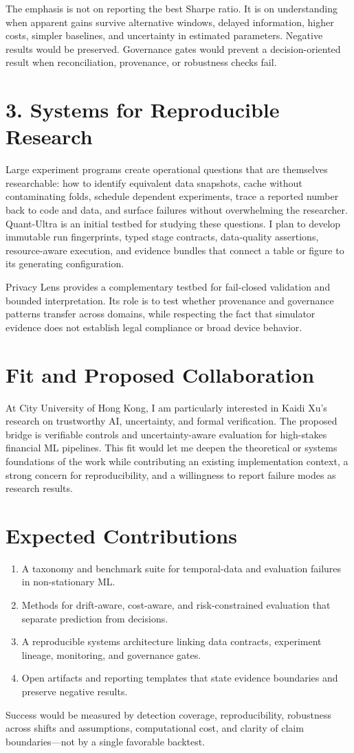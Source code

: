\documentclass[11pt]{article}
\begin{document}
The emphasis is not on reporting the best Sharpe ratio. It is on understanding when apparent gains survive alternative windows, delayed information, higher costs, simpler baselines, and uncertainty in estimated parameters. Negative results would be preserved. Governance gates would prevent a decision-oriented result when reconciliation, provenance, or robustness checks fail.

\section*{3. Systems for Reproducible Research}
Large experiment programs create operational questions that are themselves researchable: how to identify equivalent data snapshots, cache without contaminating folds, schedule dependent experiments, trace a reported number back to code and data, and surface failures without overwhelming the researcher. Quant-Ultra is an initial testbed for studying these questions. I plan to develop immutable run fingerprints, typed stage contracts, data-quality assertions, resource-aware execution, and evidence bundles that connect a table or figure to its generating configuration.

Privacy Lens provides a complementary testbed for fail-closed validation and bounded interpretation. Its role is to test whether provenance and governance patterns transfer across domains, while respecting the fact that simulator evidence does not establish legal compliance or broad device behavior.

\section*{Fit and Proposed Collaboration}
At City University of Hong Kong, I am particularly interested in Kaidi Xu's research on trustworthy AI, uncertainty, and formal verification. The proposed bridge is verifiable controls and uncertainty-aware evaluation for high-stakes financial ML pipelines. This fit would let me deepen the theoretical or systems foundations of the work while contributing an existing implementation context, a strong concern for reproducibility, and a willingness to report failure modes as research results.

\section*{Expected Contributions}
\begin{enumerate}
\item A taxonomy and benchmark suite for temporal-data and evaluation failures in non-stationary ML.
\item Methods for drift-aware, cost-aware, and risk-constrained evaluation that separate prediction from decisions.
\item A reproducible systems architecture linking data contracts, experiment lineage, monitoring, and governance gates.
\item Open artifacts and reporting templates that state evidence boundaries and preserve negative results.
\end{enumerate}

Success would be measured by detection coverage, reproducibility, robustness across shifts and assumptions, computational cost, and clarity of claim boundaries---not by a single favorable backtest.
\end{document}
